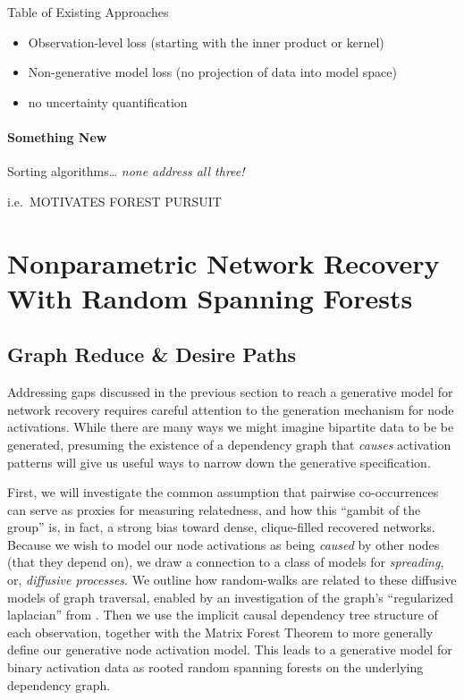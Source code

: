 \documentclass[%
	12pt,
		oneside,
		letterpaper
]{book}
\providecommand{\tightlist}{%
  \setlength{\itemsep}{0pt}\setlength{\parskip}{0pt}}\usepackage{longtable,booktabs,array}
\begin{document}
Table of Existing Approaches

\begin{itemize}
\tightlist
\item
  Observation-level loss (starting with the inner product or kernel)
\item
  Non-generative model loss (no projection of data into model space)
\item
  no uncertainty quantification
\end{itemize}

\subsection{Something New}\label{something-new}

Sorting algorithms\ldots{} \emph{none address all three!}

i.e.~MOTIVATES FOREST PURSUIT

\part{Nonparametric Network Recovery With Random Spanning Forests}

\chapter{Graph Reduce \& Desire Paths}\label{graph-reduce-desire-paths}

Addressing gaps discussed in the previous section to reach a generative
model for network recovery requires careful attention to the generation
mechanism for node activations. While there are many ways we might
imagine bipartite data to be be generated, presuming the existence of a
dependency graph that \emph{causes} activation patterns will give us
useful ways to narrow down the generative specification.

First, we will investigate the common assumption that pairwise
co-occurrences can serve as proxies for measuring relatedness, and how
this ``gambit of the group'' is, in fact, a strong bias toward dense,
clique-filled recovered networks. Because we wish to model our node
activations as being \emph{caused} by other nodes (that they depend on),
we draw a connection to a class of models for \emph{spreading}, or,
\emph{diffusive processes}. We outline how random-walks are related to
these diffusive models of graph traversal, enabled by an investigation
of the graph's ``regularized laplacian'' from
\textcite{Semisupervisedlearning_Avrachenkov2017}. Then we use the
implicit causal dependency tree structure of each observation, together
with the Matrix Forest Theorem
\autocite{MatrixForestTheorem_Chebotarev2006,Countingrootedforests_Knill2013}
to more generally define our generative node activation model. This
leads to a generative model for binary activation data as rooted random
spanning forests on the underlying dependency graph.
\end{document}
